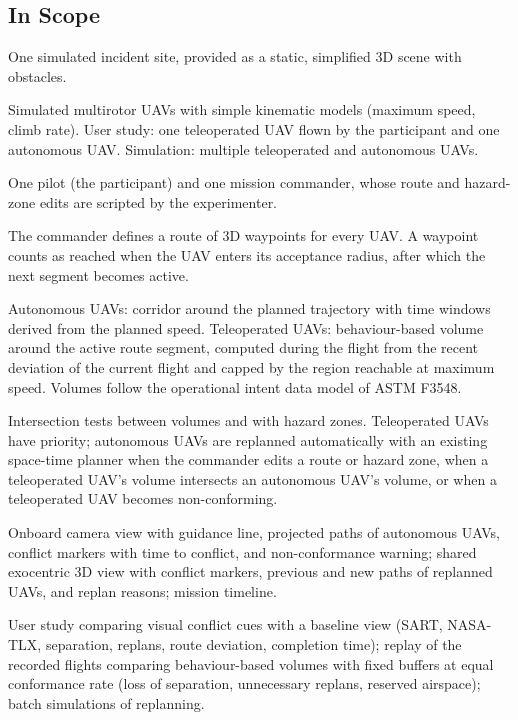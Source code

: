 \documentclass{article}
\begin{document}
\subsection{In Scope}
\begin{description}[style=nextline]
  \item[Scenario] One simulated incident site, provided as a static, simplified 3D scene with obstacles.
  \item[UAVs] Simulated multirotor UAVs with simple kinematic models (maximum speed, climb rate). User study: one teleoperated UAV flown by the participant and one autonomous UAV. Simulation: multiple teleoperated and autonomous UAVs.
  \item[Roles] One pilot (the participant) and one mission commander, whose route and hazard-zone edits are scripted by the experimenter.
  \item[Routes] The commander defines a route of 3D waypoints for every UAV. A waypoint counts as reached when the UAV enters its acceptance radius, after which the next segment becomes active.
  \item[4D volumes] Autonomous UAVs: corridor around the planned trajectory with time windows derived from the planned speed. Teleoperated UAVs: behaviour-based volume around the active route segment, computed during the flight from the recent deviation of the current flight and capped by the region reachable at maximum speed. Volumes follow the operational intent data model of ASTM F3548.
  \item[Conflict resolution] Intersection tests between volumes and with hazard zones. Teleoperated UAVs have priority; autonomous UAVs are replanned automatically with an existing space-time planner when the commander edits a route or hazard zone, when a teleoperated UAV's volume intersects an autonomous UAV's volume, or when a teleoperated UAV becomes non-conforming.
  \item[Visual cues] Onboard camera view with guidance line, projected paths of autonomous UAVs, conflict markers with time to conflict, and non-conformance warning; shared exocentric 3D view with conflict markers, previous and new paths of replanned UAVs, and replan reasons; mission timeline.
  \item[Evaluation] User study comparing visual conflict cues with a baseline view (SART, NASA-TLX, separation, replans, route deviation, completion time); replay of the recorded flights comparing behaviour-based volumes with fixed buffers at equal conformance rate (loss of separation, unnecessary replans, reserved airspace); batch simulations of replanning.
\end{description}
\end{document}
